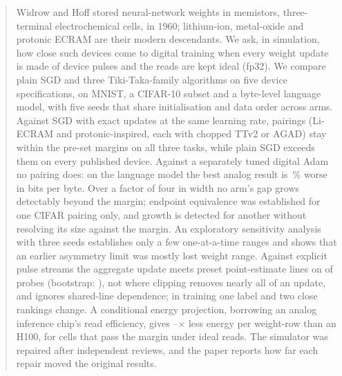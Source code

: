 \begin{abstract}
Widrow and Hoff stored neural-network weights in memistors, three-terminal electrochemical cells, in 1960; lithium-ion,
metal-oxide and protonic ECRAM are their modern descendants. We ask, in simulation, how close such devices come to digital
training when every weight update is made of device pulses and the reads are kept ideal (fp32). We compare plain SGD and three
Tiki-Taka-family algorithms on five device specifications, on MNIST, a CIFAR-10 subset and a byte-level language model, with five
seeds that share initialisation and data order across arms. Against SGD with exact updates at the same learning rate,
\RVAllThreeFpN{} pairings (Li-ECRAM and protonic-inspired, each with chopped TTv2 or AGAD) stay within the pre-set margins on all
three tasks, while plain SGD exceeds them on every published device. Against a separately tuned digital Adam no pairing does: on
the language model the best analog result is \RVLmAdamBestGap\,\% worse in bits per byte. Over a factor of four in width no
arm's gap grows detectably beyond the margin; endpoint equivalence was established for one CIFAR pairing only, and growth is detected for another without resolving its size against the margin. An exploratory sensitivity analysis with three seeds establishes only a few one-at-a-time
ranges and shows that an earlier asymmetry limit was mostly lost weight range. Against explicit pulse streams the aggregate
update meets preset point-estimate lines on \RYProbeSurMeetsN{} of \RYProbeN{} probes (bootstrap:
\RYProbeSurAtNinetyFiveN), not where clipping removes nearly all of an
update, and ignores shared-line dependence; in training one label and two close rankings change. A conditional energy projection, borrowing an analog inference chip's read efficiency, gives
\RVenSysMin--\RVenChipMax$\times$ less energy per weight-row than an H100, for cells that pass the margin under ideal reads. The simulator was repaired after independent reviews, and the paper reports how far each repair moved the original results.
\end{abstract}

